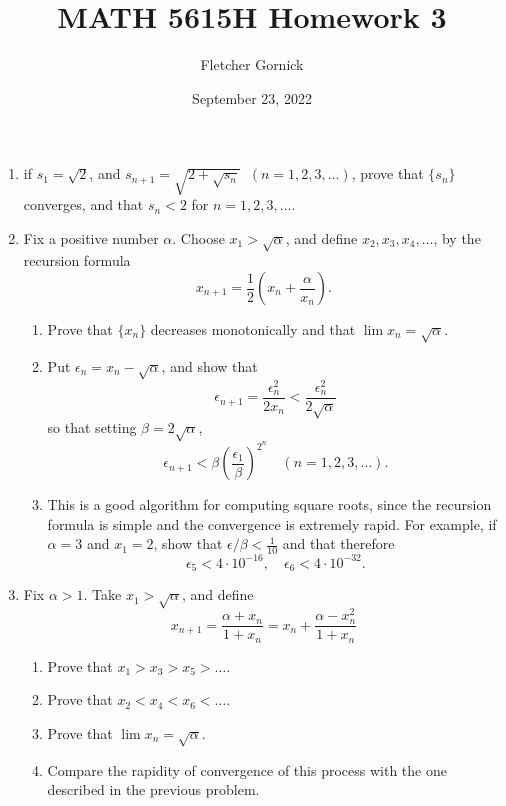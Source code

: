 \documentclass[11pt]{article}
\title{\vspace{-1.0cm}MATH 5615H Homework 3}
\author{Fletcher Gornick}
\date{September 23, 2022}
\begin{document}
 \maketitle
 \begin{enumerate}[leftmargin=0pt, label=\arabic*)]
 \item if \(s_1 = \sqrt{2}\), and \(s_{n+1} = \sqrt{2 + \sqrt{s_n}} \;\; (n = 1,2,3,\dots)\),
 prove that \(\{s_n\}\) converges, and that \(s_n < 2\) for \(n = 1, 2, 3, \dots\).
 \newpage

 \item Fix a positive number \(\alpha\).  Choose \(x_1 > \sqrt{\alpha}\), and define 
 \(x_2, x_3, x_4, \dots\), by the recursion formula
 \[x_{n+1} = \frac{1}{2}\left(x_n + \frac{\alpha}{x_n}\right).\]

 \begin{enumerate}[label=(\alph*)]
   \item Prove that \(\{x_n\}\) decreases monotonically and that \(\lim x_n = \sqrt{\alpha}\).
   \item Put \(\epsilon_n = x_n - \sqrt{\alpha}\), and show that
     \[\epsilon_{n+1} = \frac{\epsilon_n^2}{2x_n} < \frac{\epsilon_n^2}{2\sqrt{\alpha}}\]
     so that setting \(\beta = 2 \sqrt{\alpha}\),
     \[\epsilon_{n+1} < \beta\left(\frac{\epsilon_1}{\beta}\right)^{2^n} \quad (n = 1, 2, 3, \dots).\]

   \item This is a good algorithm for computing square roots, since the recursion formula is simple and the 
     convergence is extremely rapid.  For example, if \(\alpha = 3\) and \(x_1 = 2\), show that 
     \(\epsilon/\beta < \frac{1}{10}\) and that therefore
     \[\epsilon_5 < 4 \cdot 10^{-16}, \quad \epsilon_6 < 4 \cdot 10^{-32}.\]
 \end{enumerate}
 \newpage

 \item Fix \(\alpha > 1\). Take \(x_1 > \sqrt{\alpha}\), and define
 \[x_{n+1} = \frac{\alpha + x_n}{1 + x_n} = x_n + \frac{\alpha - x_n^2}{1 + x_n}\]

 \begin{enumerate}[label=(\alph*)]
   \item Prove that \(x_1 > x_3 > x_5 > \dots\).
   \item Prove that \(x_2 < x_4 < x_6 < \dots\).
   \item Prove that \(\lim x_n = \sqrt{\alpha}\).
   \item Compare the rapidity of convergence of this process with the one described in the previous problem.
 \end{enumerate}
 \newpage


\end{enumerate}
\end{document}
